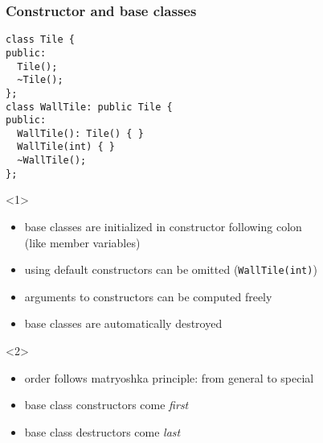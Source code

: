 \documentclass{slides}
\begin{document}
\begin{frame}[fragile]
  \frametitle{Constructor and base classes}

\begin{lstlisting}
class Tile {
public:
  Tile();
  ~Tile();
};
class WallTile: public Tile {
public:
  WallTile(): Tile() { }  
  WallTile(int) { }  
  ~WallTile();
};
\end{lstlisting}

  \begin{onlyenv}<1>
    \begin{itemize}
    \item base classes are initialized in constructor following colon\\
      (like member variables)
    \item using default constructors can be omitted (\lstinline!WallTile(int)!)
    \item arguments to constructors can be computed freely
    \item base classes are automatically destroyed
    \end{itemize}
  \end{onlyenv}

  \begin{onlyenv}<2>
    \begin{itemize}
    \item order follows matryoshka principle: from general to special
    \item base class constructors come \emph{first}
    \item base class destructors come \emph{last}
    \end{itemize}
  \end{onlyenv}
\end{frame}
\end{document}
